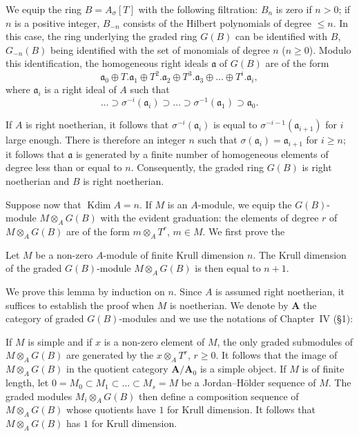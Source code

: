 We equip the ring $B=A_\sigma[T]$ with the following filtration:
$B_n$ is zero if $n>0$; if $n$ is a positive integer, $B_{-n}$
consists of the Hilbert polynomials of degree $\le n$. In this case,
the ring underlying the graded ring $G(B)$ can be identified with $B$,
$G_{-n}(B)$ being identified with the set of monomials of degree $n$
($n\ge0$). Modulo this identification, the homogeneous right ideals
$\mathfrak{a}$ of $G(B)$ are of the form
\[
\mathfrak{a}_0\oplus T.\mathfrak{a}_1\oplus T^2.\mathfrak{a}_2\oplus
T^3.\mathfrak{a}_3\oplus\ldots\oplus T^i.\mathfrak{a}_i,
\]
where $\mathfrak{a}_i$ is a right ideal of $A$ such that
\[
\ldots\supset\sigma^{-i}(\mathfrak{a}_i)\supset\ldots\supset
\sigma^{-1}(\mathfrak{a}_1)\supset\mathfrak{a}_0.
\]

If $A$ is right noetherian, it follows that
$\sigma^{-i}(\mathfrak{a}_i)$ is equal to
$\sigma^{-i-1}(\mathfrak{a}_{i+1})$ for $i$ large enough. There is
therefore an integer $n$ such that
$\sigma(\mathfrak{a}_i)=\mathfrak{a}_{i+1}$ for $i\ge n$; it follows
that $\mathfrak{a}$ is generated by a finite number of homogeneous
elements of degree less than or equal to $n$. Consequently, the graded
ring $G(B)$ is right noetherian and $B$ is right noetherian.

Suppose now that $\operatorname{Kdim}A=n$. If $M$ is an $A$-module, we
equip the $G(B)$-module $M\otimes_AG(B)$ with the evident graduation:
the elements of degree $r$ of $M\otimes_AG(B)$ are of the form
$m\otimes_AT^r$, $m\in M$. We first prove the

\begin{lemma}
Let $M$ be a non-zero $A$-module of finite Krull dimension $n$. The
Krull dimension of the graded $G(B)$-module $M\otimes_AG(B)$ is then
equal to $n+1$.
\end{lemma}

We prove this lemma by induction on $n$. Since $A$ is assumed right
noetherian, it suffices to establish the proof when $M$ is noetherian.
We denote by $\mathbf{A}$ the category of graded $G(B)$-modules and we
use the notations of Chapter~IV (\S1):

If $M$ is simple and if $x$ is a non-zero element of $M$, the only
graded submodules of $M\otimes_AG(B)$ are generated by the
$x\otimes_AT^r$, $r\ge0$. It follows that the image of
$M\otimes_AG(B)$ in the quotient category
$\mathbf{A}/\mathbf{A}_0$ is a simple object. If $M$ is of finite
length, let $0=M_0\subset M_1\subset\ldots\subset M_s=M$ be a
Jordan--Hölder sequence of $M$. The graded modules
$M_i\otimes_AG(B)$ then define a composition sequence of
$M\otimes_AG(B)$ whose quotients have $1$ for Krull dimension. It
follows that $M\otimes_AG(B)$ has $1$ for Krull dimension.

